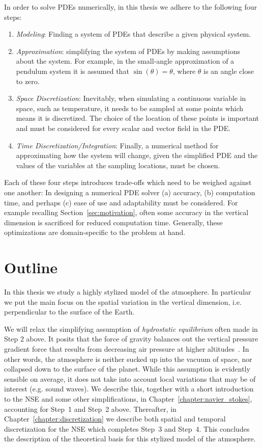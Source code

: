 \noindent
In order to solve PDEs numerically, in this thesis we adhere to the following four steps:
\begin{enumerate}
\item \emph{Modeling}: Finding a system of PDEs that describe a given physical system.
\item \emph{Approximation}: simplifying the system of PDEs by making assumptions about the system. For example, in the small-angle approximation of a pendulum system it is assumed that $\sin(\theta)=\theta$, where $\theta$ is an angle close to zero.
\item \emph{Space Discretization}: Inevitably, when simulating a continuous variable in space, such as temperature, it needs to be sampled at some points which means it is discretized.
The choice of the location of these points is important and must be considered for every scalar and vector field in the PDE.
\item \emph{Time Discretization/Integration}: Finally, a numerical method for approximating how the system will change, given the simplified PDE and the values of the variables at the sampling locations, must be chosen.
\end{enumerate}
Each of these four steps introduces trade-offs which need to be weighed against one another:
In designing a numerical PDE solver (a) accuracy, (b) computation time, and perhaps (c) ease of use and adaptability must be considered.
For example recalling Section~\ref{sec:motivation}, often some accuracy in the vertical dimension is sacrificed for reduced computation time.
Generally, these optimizations are domain-specific to the problem at hand.

\section{Outline}
In this thesis we study a highly stylized model of the atmosphere.
In particular we put the main focus on the spatial variation in the vertical dimension, i.e. perpendicular to the surface of the Earth.

We will relax the simplifying assumption of \emph{hydrostatic equilibrium} often made in Step 2 above.
It posits that the force of gravity balances out the vertical pressure gradient force that results from decreasing air pressure at higher altitudes~\cite{coiffier2011fundamentals}.
In other words, the atmosphere is neither sucked up into the vacuum of space, nor collapsed down to the surface of the planet.
While this assumption is evidently sensible on average, it does not take into account local variations that may be of interest (e.g. sound waves).
We describe this, together with a short introduction to the NSE and some other simplifications, in Chapter~\ref{chapter:navier_stokes}, accounting for Step~1 and Step~2 above.
Thereafter, in Chapter~\ref{chapter:discretization} we describe both spatial and temporal discretization for the NSE which completes Step~3 and Step~4.
This concludes the description of the theoretical basis for this stylized model of the atmosphere.

